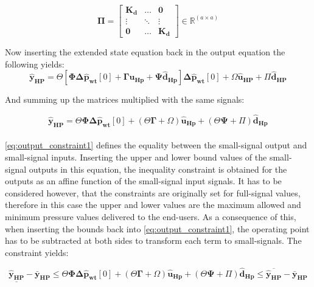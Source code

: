  \begin{equation}
 \bm{\Pi} =
 \begin{bmatrix}
 \bm{K_d} & \hdots & \bm{0} \\
 \vdots & \ddots & \vdots\\
 \bm{0} & \hdots & \bm{K_d} 
 \end{bmatrix}
 \in \pmb{\mathbb{R}}^{(a \times a)}
 \end{equation}


Now inserting the extended state equation back in the output equation the following yields: 
\begin{equation}
	\bm{\hat{y}_{HP}} = \Theta [\bm{\Phi} \bm{\Delta \hat{p}_{wt}}[0] + \bm{\Gamma} \bm{\hat{u}_{Hp}} + \bm{\Psi} \bm{\hat{d}_{Hp}}] \bm{\Delta \hat{p}_{wt}}[0] + \Omega \bm{\hat{u}_{HP}} + \Pi \bm{\hat{d}_{HP}}
\end{equation}

And summing up the matrices multiplied with the same signals: 

\begin{equation}
	\bm{\hat{y}_{HP}} = \Theta \bm{\Phi} \bm{\Delta \hat{p}_{wt}}[0] +  (\Theta \bm{\Gamma}+ \Omega) \bm{\hat{u}_{Hp}} + (\Theta \bm{\Psi} + \Pi)  \bm{\hat{d}_{Hp}}
	\label{eq:output_constraint1}
\end{equation}
\\
\eqref{eq:output_constraint1} defines the equality between the small-signal output and small-signal inputs. Inserting the upper and lower bound values of the small-signal outputs in this equation, the inequality constraint is obtained for the outputs as an affine function of the small-signal input signals. It has to be considered however, that the constraints are originally set for full-signal values, therefore in this case the upper and lower values are the maximum allowed and minimum pressure values delivered to the end-users. As a consequence of this, when inserting the bounds back into \eqref{eq:output_constraint1}, the operating point has to be subtracted at both sides to transform each term to small-signals. The constraint yields: 

\begin{equation}
	\underline{\bm{\hat{y}_{HP}}} - \bm{\bar{y}_{HP}} \leq \Theta \bm{\Phi} \bm{\Delta \hat{p}_{wt}}[0] +  (\Theta \bm{\Gamma}+ \Omega) \bm{\hat{u}_{Hp}} + (\Theta \bm{\Psi} + \Pi)  \bm{\hat{d}_{Hp}} \leq \overline{\bm{\hat{y}_{HP}}} - \bm{\bar{y}_{HP}}
	\label{eq:output_constraint2}
\end{equation}

